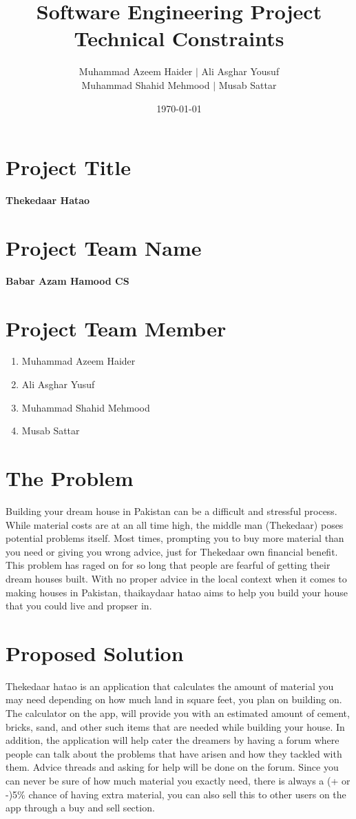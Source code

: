 \documentclass{article}
\title{Software Engineering Project Technical Constraints}
\author{Muhammad Azeem Haider $\mid$ Ali Asghar Yousuf \\
        Muhammad Shahid Mehmood $\mid$ Musab Sattar}
\date{\today}
\begin{document}
\maketitle

\section*{Project Title}

\textbf{Thekedaar Hatao}

\section*{Project Team Name}

\textbf{Babar Azam Hamood CS}

\section*{Project Team Member}

\begin{enumerate}
    \item Muhammad Azeem Haider
    \item Ali Asghar Yusuf
    \item Muhammad Shahid Mehmood
    \item Musab Sattar
\end{enumerate}

\section*{The Problem}

Building your dream house in Pakistan can be a difficult and stressful process. While material costs are at an all time high, the middle man (Thekedaar) poses
potential problems itself. Most times, prompting you to buy more material than you need or giving you wrong advice, just for Thekedaar own financial benefit.
This problem has raged on for so long that people are fearful of getting their dream houses built. With no proper advice in the local context when it comes to
making houses in Pakistan, thaikaydaar hatao aims to help you build your house that you could live and propser in. 

\section*{Proposed Solution}

Thekedaar hatao is an application that calculates the amount of material you may need depending on how much land in square feet, you plan on building on.
The calculator on the app, will provide you with an estimated amount of cement, bricks, sand, and other such items that are needed while building your house.
In addition, the application will help cater the dreamers by having a forum where people can talk about the problems that have arisen and how they tackled with them.
Advice threads and asking for help will be done on the forum. Since you can never be sure of how much material you exactly need, there is always a (+ or -)5\%
chance of having extra material, you can also sell this to other users on the app through a buy and sell section.
\end{document}
